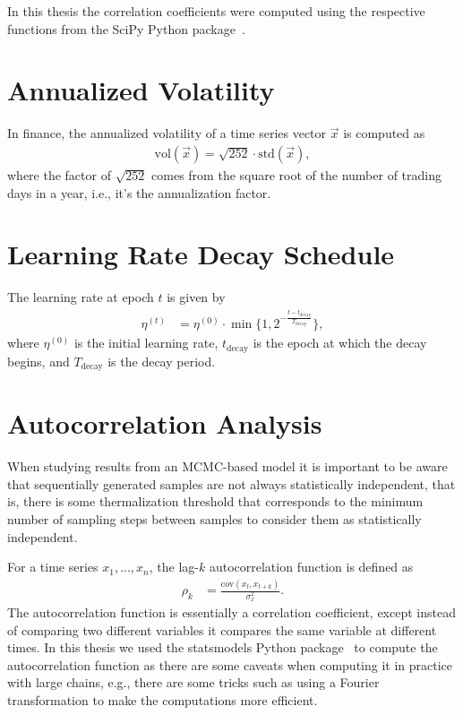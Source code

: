 In this thesis the correlation coefficients were computed using the respective functions from the SciPy Python package~\cite{python_scipy}.

\section{Annualized Volatility}\label{app:annualized_volatility}
In finance, the annualized volatility of a time series vector \( \vec{x} \) is computed as
\begin{align}
    \text{vol}(\vec{x}) = \sqrt{252} \cdot \text{std}(\vec{x}),
\end{align}
where the factor of \( \sqrt{252} \) comes from the square root of the number of trading days in a year, i.e., it's the annualization factor.

\section{Learning Rate Decay Schedule}\label{app:lr_exp_decay}
The learning rate at epoch \( t \) is given by
\begin{align}
    \eta^{(t)}
        &= \eta^{(0)} \cdot \min\bigg\{1, 2^{-\frac{t - t_\text{decay}}{T_\text{decay}}}\bigg\},
\end{align}
where \( \eta^{(0)} \) is the initial learning rate, \( t_\text{decay} \) is the epoch at which the decay begins, and \( T_\text{decay} \) is the decay period.

\section{Autocorrelation Analysis}\label{app:autocorrelation_analysis}
When studying results from an MCMC-based model it is important to be aware that sequentially generated samples are not always statistically independent, that is, there is some thermalization threshold that corresponds to the minimum number of sampling steps between samples to consider them as statistically independent.

For a time series \( x_1, \dots, x_n \), the lag-\( k \) autocorrelation function is defined as~\cite{time_series_analysis}
\begin{align}
    \rho_k
        &= \frac{\text{cov}(x_t, x_{t+k})}{\sigma_{x}^2}.
\end{align}
The autocorrelation function is essentially a correlation coefficient, except instead of comparing two different variables it compares the same variable at different times.
In this thesis we used the statsmodels Python package~\cite{python_statsmodels} to compute the autocorrelation function as there are some caveats when computing it in practice with large chains, e.g., there are some tricks such as using a Fourier transformation to make the computations more efficient.

